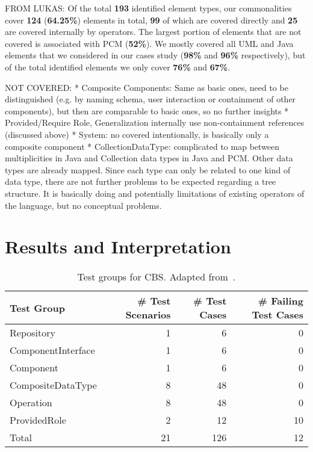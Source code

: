 FROM LUKAS: 
Of the total \textbf{193} identified element types, our commonalities cover \textbf{124} (\textbf{64.25\%}) elements in total, \textbf{99} of which are covered directly and \textbf{25} are covered internally by operators. The largest portion of elements that are not covered is associated with PCM (\textbf{52\%}). We mostly covered all UML and Java elements that we considered in our cases study (\textbf{98\%} and \textbf{96\%} respectively), but of the total identified elements we only cover \textbf{76\%} and \textbf{67\%}.


NOT COVERED:
* Composite Components: Same as basic ones, need to be distinguished (e.g. by naming schema, user interaction or containment of other components), but then are comparable to basic ones, so no further insights
* Provided/Require Role, Generalization internally use non-containment references (discussed above)
* System: no covered intentionally, is basically only a composite component
* CollectionDataType: complicated to map between multiplicities in Java and Collection data types in Java and PCM. Other data types are already mapped. Since each type can only be related to one kind of data type, there are not further problems to be expected regarding a tree structure. It is basically doing and potentially limitations of existing operators of the language, but no conceptual problems.


\section{Results and Interpretation}

\begin{table}[htb]
	\centering
		\begin{tabular}{lrrr}
			\toprule
			\multicolumn{1}{l}{\bfseries Test Group} & \multicolumn{1}{r}{\bfseries \# Test Scenarios} & \multicolumn{1}{r}{\bfseries \# Test Cases} & \multicolumn{1}{r}{\bfseries \# Failing Test Cases} \\
			\midrule
			Repository 				& 1	& 6		& 0		 \\
			ComponentInterface 		& 1 & 6		& 0		 \\
			Component 				& 1	& 6		& 0		 \\
			CompositeDataType 		& 8	& 48	& 0		 \\
			Operation 				& 8	& 48	& 0		 \\
			ProvidedRole 			& 2	& 12	& 10		 \\
			\midrule
			Total 					& 21& 126	& 12		 \\
			\bottomrule
		\end{tabular}
	\caption{Test groups for CBS. Adapted from~\cite[Table 10.1]{hennig2020ma}.}
	\label{tab:commonalities_evaluation:tests_cbs}
\end{table}

